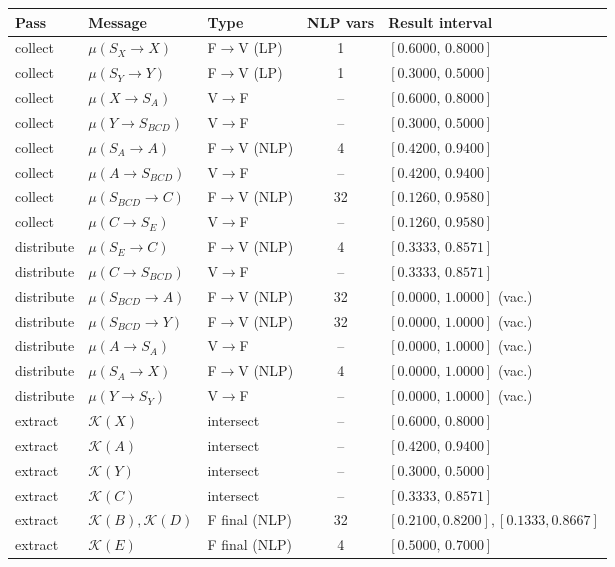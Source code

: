 \documentclass[11pt]{article}
\newcommand{\cK}{\mathcal{K}}
\begin{document}
\begin{center}
\begin{tabular}{lllcl}
\toprule
\textbf{Pass} & \textbf{Message} & \textbf{Type} & \textbf{NLP vars} & \textbf{Result interval} \\
\midrule
collect & $\mu(S_X\!\to\!X)$        & F$\to$V (LP)  & 1  & $[0.6000,\,0.8000]$ \\
collect & $\mu(S_Y\!\to\!Y)$        & F$\to$V (LP)  & 1  & $[0.3000,\,0.5000]$ \\
collect & $\mu(X\!\to\!S_A)$        & V$\to$F       & -- & $[0.6000,\,0.8000]$ \\
collect & $\mu(Y\!\to\!S_{BCD})$    & V$\to$F       & -- & $[0.3000,\,0.5000]$ \\
collect & $\mu(S_A\!\to\!A)$        & F$\to$V (NLP) & 4  & $[0.4200,\,0.9400]$ \\
collect & $\mu(A\!\to\!S_{BCD})$    & V$\to$F       & -- & $[0.4200,\,0.9400]$ \\
collect & $\mu(S_{BCD}\!\to\!C)$    & F$\to$V (NLP) & 32 & $[0.1260,\,0.9580]$ \\
collect & $\mu(C\!\to\!S_E)$        & V$\to$F       & -- & $[0.1260,\,0.9580]$ \\
\midrule
distribute & $\mu(S_E\!\to\!C)$     & F$\to$V (NLP) & 4  & $[0.3333,\,0.8571]$ \\
distribute & $\mu(C\!\to\!S_{BCD})$ & V$\to$F       & -- & $[0.3333,\,0.8571]$ \\
distribute & $\mu(S_{BCD}\!\to\!A)$ & F$\to$V (NLP) & 32 & $[0.0000,\,1.0000]$ (vac.) \\
distribute & $\mu(S_{BCD}\!\to\!Y)$ & F$\to$V (NLP) & 32 & $[0.0000,\,1.0000]$ (vac.) \\
distribute & $\mu(A\!\to\!S_A)$     & V$\to$F       & -- & $[0.0000,\,1.0000]$ (vac.) \\
distribute & $\mu(S_A\!\to\!X)$     & F$\to$V (NLP) & 4  & $[0.0000,\,1.0000]$ (vac.) \\
distribute & $\mu(Y\!\to\!S_Y)$     & V$\to$F       & -- & $[0.0000,\,1.0000]$ (vac.) \\
\midrule
extract & $\cK(X)$                  & intersect & -- & $[0.6000,\,0.8000]$ \\
extract & $\cK(A)$                  & intersect & -- & $[0.4200,\,0.9400]$ \\
extract & $\cK(Y)$                  & intersect & -- & $[0.3000,\,0.5000]$ \\
extract & $\cK(C)$                  & intersect & -- & $[0.3333,\,0.8571]$ \\
extract & $\cK(B),\cK(D)$           & F final (NLP) & 32 & $[0.2100,0.8200],[0.1333,0.8667]$ \\
extract & $\cK(E)$                  & F final (NLP) & 4  & $[0.5000,\,0.7000]$ \\
\bottomrule
\end{tabular}
\end{center}
\end{document}
